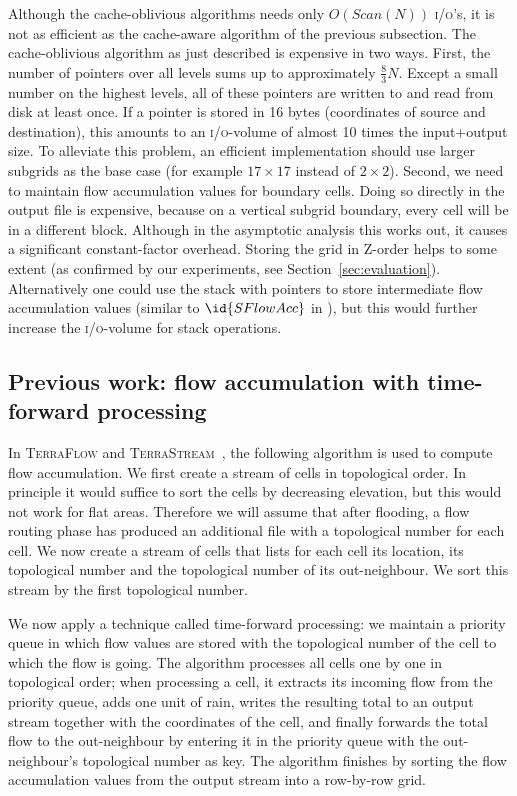 \documentclass[10pt,a4paper]{article}
\def\io{\textsc{i/o}\xspace}
\def\ios{\textsc{i/o}'s\xspace}
\def\tsm{\textsc{TerraStream}\xspace}
\def\tfl{\textsc{TerraFlow}\xspace}
\def\scan{\mathit{Scan}}
\begin{document}
Although the cache-oblivious algorithms needs only $O(\scan(N))$ \ios, it is not as efficient as the cache-aware algorithm of the previous subsection. The cache-oblivious algorithm as just described is expensive in two ways. First, the number of pointers over all levels sums up to approximately $\frac83 N$. Except a small number on the highest levels, all of these pointers are written to and read from disk at least once. If a pointer is stored in 16 bytes (coordinates of source and destination), this amounts to an \io-volume of almost 10 times the input+output size. To alleviate this problem, an efficient implementation should use larger subgrids as the base case (for example $17 \times 17$ instead of $2 \times 2$). Second, we need to maintain flow accumulation values for boundary cells. Doing so directly in the output file is expensive, because on a vertical subgrid boundary, every cell will be in a different block. Although in the asymptotic analysis this works out, it causes a significant constant-factor overhead. Storing the grid in Z-order helps to some extent (as confirmed by our experiments, see Section~\ref{sec:evaluation}). Alternatively one could use the stack with pointers to store intermediate flow accumulation values (similar to $\id{SFlowAcc}$ in ), but this would further increase the \io-volume for stack operations.

\subsection{Previous work: flow accumulation with time-forward processing}\label{sec:tfpaccumulation}

In \tfl and \tsm~\cite{terraflow,terrastream}, the following algorithm is used to compute flow accumulation. We first create a stream of cells in topological order. In principle it would suffice to sort the cells by decreasing elevation, but this would not work for flat areas. Therefore we will assume that after flooding, a flow routing phase has produced an additional file with a topological number for each cell. We now create a stream of cells that lists for each cell its location, its topological number and the topological number of its out-neighbour. We sort this stream by the first topological number.

We now apply a technique called time-forward processing: we maintain a priority queue in which flow values are stored with the topological number of the cell to which the flow is going. The algorithm processes all cells one by one in topological order; when processing a cell, it extracts its incoming flow from the priority queue, adds one unit of rain, writes the resulting total to an output stream together with the coordinates of the cell, and finally forwards the total flow to the out-neighbour by entering it in the priority queue with the out-neighbour's topological number as key. The algorithm finishes by sorting the flow accumulation values from the output stream into a row-by-row grid.
\end{document}
